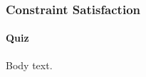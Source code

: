 \documentclass{beamer}
\begin{document}
\begin{frame}[c]
\frametitle{Constraint Satisfaction}
\framesubtitle{Quiz}
Body text.
\end{frame}
\end{document}

